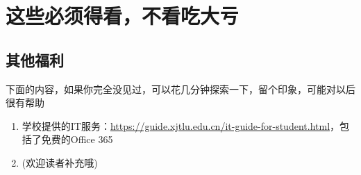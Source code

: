 
\chapter{这些必须得看，不看吃大亏}
\label{fuli}






% 

\section{其他福利}

下面的内容，如果你完全没见过，可以花几分钟探索一下，留个印象，可能对以后很有帮助

\begin{enumerate}
    \item 学校提供的IT服务：\url{https://guide.xjtlu.edu.cn/it-guide-for-student.html}，包括了免费的Office 365
    \item (欢迎读者补充哦)
\end{enumerate}

